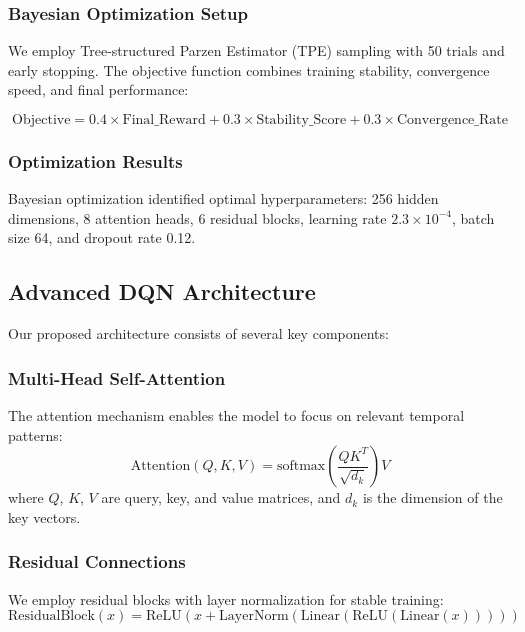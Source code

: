\documentclass[12pt,a4paper]{article}
\begin{document}
\subsubsection{Bayesian Optimization Setup}
We employ Tree-structured Parzen Estimator (TPE) sampling with 50 trials and early stopping. The objective function combines training stability, convergence speed, and final performance:

\begin{equation}
\text{Objective} = 0.4 \times \text{Final\_Reward} + 0.3 \times \text{Stability\_Score} + 0.3 \times \text{Convergence\_Rate}
\end{equation}

\subsubsection{Optimization Results}
Bayesian optimization identified optimal hyperparameters: 256 hidden dimensions, 8 attention heads, 6 residual blocks, learning rate $2.3 \times 10^{-4}$, batch size 64, and dropout rate 0.12.

\subsection{Advanced DQN Architecture}

Our proposed architecture consists of several key components:

\subsubsection{Multi-Head Self-Attention}
The attention mechanism enables the model to focus on relevant temporal patterns:
\begin{equation}
\text{Attention}(Q, K, V) = \text{softmax}\left(\frac{QK^T}{\sqrt{d_k}}\right)V
\end{equation}
where $Q$, $K$, $V$ are query, key, and value matrices, and $d_k$ is the dimension of the key vectors.

\subsubsection{Residual Connections}
We employ residual blocks with layer normalization for stable training:
\begin{equation}
\text{ResidualBlock}(x) = \text{ReLU}(x + \text{LayerNorm}(\text{Linear}(\text{ReLU}(\text{Linear}(x)))))
\end{equation}
\end{document}
